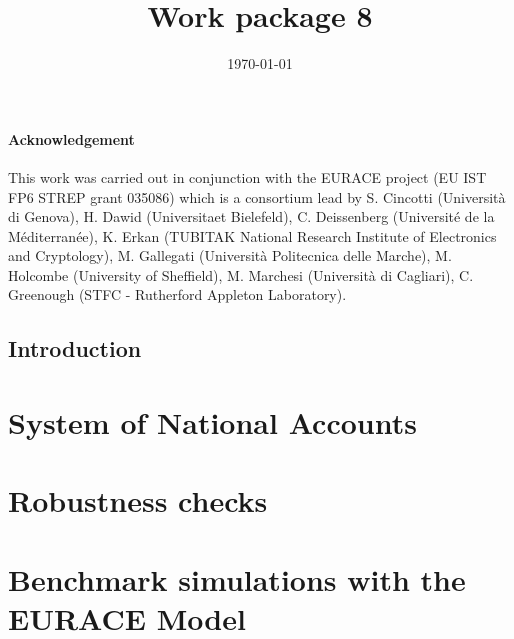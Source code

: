 \documentclass[a4paper,11pt]{book}
\begin{document}
\title{Work package 8}
\author{}
\date{\today}
\maketitle
\tableofcontents

\subsubsection*{Acknowledgement}
This work was carried out in conjunction with the EURACE project (EU IST FP6
STREP grant 035086) which is a consortium lead by S. Cincotti (Universit\`{a} di
Genova), H. Dawid (Universitaet Bielefeld), C. Deissenberg (Universit\'{e} de la
M\'{e}diterran\'{e}e), K. Erkan (TUBITAK National Research Institute of Electronics
and Cryptology), M. Gallegati  (Universit\`{a} Politecnica delle Marche), M.
Holcombe (University of Sheffield), M. Marchesi (Universit\`{a} di Cagliari), C.
Greenough (STFC - Rutherford Appleton Laboratory).


\section*{Introduction}


\chapter{System of National Accounts}



\chapter{Robustness checks}


\chapter{Benchmark simulations with the EURACE Model}


%




\end{document}
